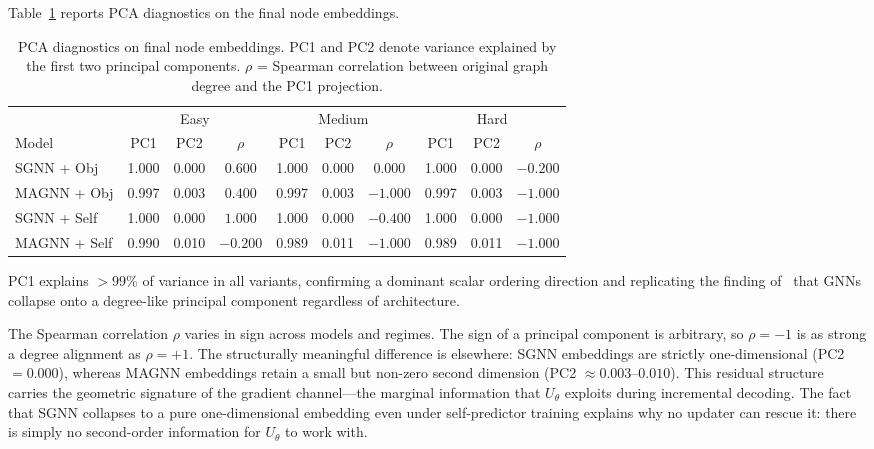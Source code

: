 \documentclass[11pt]{article}
\theoremstyle{plain}
\theoremstyle{definition}
\theoremstyle{remark}
\begin{document}
Table~\ref{tab:pca} reports PCA diagnostics on the final node embeddings.

\begin{table}[t]
  \centering
  \caption{PCA diagnostics on final node embeddings. PC1 and PC2 denote variance
    explained by the first two principal components. $\rho$ = Spearman correlation
  between original graph degree and the PC1 projection.}
  \label{tab:pca}
  \begin{tabular}{lccccccccc}
    \toprule
    & \multicolumn{3}{c}{Easy} & \multicolumn{3}{c}{Medium}
    & \multicolumn{3}{c}{Hard} \\
    \cmidrule(lr){2-4}\cmidrule(lr){5-7}\cmidrule(lr){8-10}
    Model & PC1 & PC2 & $\rho$
    & PC1 & PC2 & $\rho$
    & PC1 & PC2 & $\rho$ \\
    \midrule
    SGNN + Obj
    & 1.000 & 0.000 & $ 0.600$
    & 1.000 & 0.000 & $ 0.000$
    & 1.000 & 0.000 & $-0.200$ \\
    MAGNN + Obj
    & 0.997 & 0.003 & $ 0.400$
    & 0.997 & 0.003 & $-1.000$
    & 0.997 & 0.003 & $-1.000$ \\
    SGNN + Self
    & 1.000 & 0.000 & $ 1.000$
    & 1.000 & 0.000 & $-0.400$
    & 1.000 & 0.000 & $-1.000$ \\
    MAGNN + Self
    & 0.990 & 0.010 & $-0.200$
    & 0.989 & 0.011 & $-1.000$
    & 0.989 & 0.011 & $-1.000$ \\
    \bottomrule
  \end{tabular}
\end{table}

PC1 explains $>99\%$ of variance in all variants, confirming a dominant scalar
ordering direction and replicating the finding of~\citet{shoham2026ltr} that GNNs
collapse onto a degree-like principal component regardless of architecture.

The Spearman correlation $\rho$ varies in sign across models and regimes. The sign of
a principal component is arbitrary, so $\rho = -1$ is as strong a degree alignment as
$\rho = +1$. The structurally meaningful difference is elsewhere: SGNN embeddings are
strictly one-dimensional (PC2 $= 0.000$), whereas MAGNN embeddings retain a small
but non-zero second dimension (PC2 $\approx 0.003$--$0.010$). This residual structure
carries the geometric signature of the gradient channel---the marginal information
that $U_\theta$ exploits during incremental decoding. The fact that SGNN collapses to
a pure one-dimensional embedding even under self-predictor training explains why no
updater can rescue it: there is simply no second-order information for $U_\theta$ to
work with.
\end{document}

